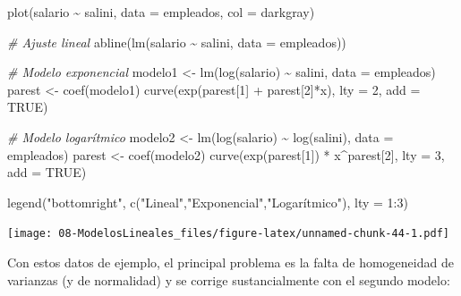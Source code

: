 \documentclass[
]{book}
\newenvironment{Shaded}{\begin{snugshade}}{\end{snugshade}}
\newcommand{\AttributeTok}[1]{\textcolor[rgb]{0.77,0.63,0.00}{#1}}
\newcommand{\CommentTok}[1]{\textcolor[rgb]{0.56,0.35,0.01}{\textit{#1}}}
\newcommand{\ConstantTok}[1]{\textcolor[rgb]{0.00,0.00,0.00}{#1}}
\newcommand{\DecValTok}[1]{\textcolor[rgb]{0.00,0.00,0.81}{#1}}
\newcommand{\FunctionTok}[1]{\textcolor[rgb]{0.00,0.00,0.00}{#1}}
\newcommand{\NormalTok}[1]{#1}
\newcommand{\OtherTok}[1]{\textcolor[rgb]{0.56,0.35,0.01}{#1}}
\newcommand{\SpecialCharTok}[1]{\textcolor[rgb]{0.00,0.00,0.00}{#1}}
\newcommand{\StringTok}[1]{\textcolor[rgb]{0.31,0.60,0.02}{#1}}
\theoremstyle{break}
\theoremstyle{nonumberplain}
\begin{document}
\begin{Shaded}
\begin{Highlighting}[]
\FunctionTok{plot}\NormalTok{(salario }\SpecialCharTok{\textasciitilde{}}\NormalTok{ salini, }\AttributeTok{data =}\NormalTok{ empleados, }\AttributeTok{col =} \StringTok{\textquotesingle{}darkgray\textquotesingle{}}\NormalTok{)}

\CommentTok{\# Ajuste lineal}
\FunctionTok{abline}\NormalTok{(}\FunctionTok{lm}\NormalTok{(salario }\SpecialCharTok{\textasciitilde{}}\NormalTok{ salini, }\AttributeTok{data =}\NormalTok{ empleados)) }

\CommentTok{\# Modelo exponencial}
\NormalTok{modelo1 }\OtherTok{\textless{}{-}} \FunctionTok{lm}\NormalTok{(}\FunctionTok{log}\NormalTok{(salario) }\SpecialCharTok{\textasciitilde{}}\NormalTok{ salini, }\AttributeTok{data =}\NormalTok{ empleados)}
\NormalTok{parest }\OtherTok{\textless{}{-}} \FunctionTok{coef}\NormalTok{(modelo1)}
\FunctionTok{curve}\NormalTok{(}\FunctionTok{exp}\NormalTok{(parest[}\DecValTok{1}\NormalTok{] }\SpecialCharTok{+}\NormalTok{ parest[}\DecValTok{2}\NormalTok{]}\SpecialCharTok{*}\NormalTok{x), }\AttributeTok{lty =} \DecValTok{2}\NormalTok{, }\AttributeTok{add =} \ConstantTok{TRUE}\NormalTok{)}

\CommentTok{\# Modelo logarítmico}
\NormalTok{modelo2 }\OtherTok{\textless{}{-}} \FunctionTok{lm}\NormalTok{(}\FunctionTok{log}\NormalTok{(salario) }\SpecialCharTok{\textasciitilde{}} \FunctionTok{log}\NormalTok{(salini), }\AttributeTok{data =}\NormalTok{ empleados)}
\NormalTok{parest }\OtherTok{\textless{}{-}} \FunctionTok{coef}\NormalTok{(modelo2)}
\FunctionTok{curve}\NormalTok{(}\FunctionTok{exp}\NormalTok{(parest[}\DecValTok{1}\NormalTok{]) }\SpecialCharTok{*}\NormalTok{ x}\SpecialCharTok{\^{}}\NormalTok{parest[}\DecValTok{2}\NormalTok{], }\AttributeTok{lty =} \DecValTok{3}\NormalTok{, }\AttributeTok{add =} \ConstantTok{TRUE}\NormalTok{)}

\FunctionTok{legend}\NormalTok{(}\StringTok{"bottomright"}\NormalTok{, }\FunctionTok{c}\NormalTok{(}\StringTok{"Lineal"}\NormalTok{,}\StringTok{"Exponencial"}\NormalTok{,}\StringTok{"Logarítmico"}\NormalTok{), }\AttributeTok{lty =} \DecValTok{1}\SpecialCharTok{:}\DecValTok{3}\NormalTok{)}
\end{Highlighting}
\end{Shaded}

\texttt{[image: 08-ModelosLineales\_files/figure-latex/unnamed-chunk-44-1.pdf]}

Con estos datos de ejemplo, el principal problema es la falta de homogeneidad de varianzas (y de normalidad) y se corrige sustancialmente con el segundo modelo:
\end{document}
